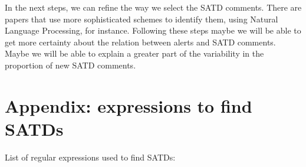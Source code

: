 \documentclass[
]{article}
\begin{document}
\normalsize

In the next steps, we can refine the way we select the SATD comments.
There are papers that use more sophisticated schemes to identify them,
using Natural Language Processing, for instance. Following these steps
maybe we will be able to get more certainty about the relation between
alerts and SATD comments. Maybe we will be able to explain a greater
part of the variability in the proportion of new SATD comments.

\section{Appendix: expressions to find SATDs}\label{sec_SATDs}

List of regular expressions used to find SATDs:

\small
\end{document}
